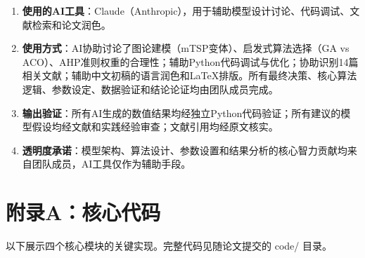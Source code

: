 \documentclass[12pt,a4paper]{ctexart}
\begin{document}
\begin{enumerate}[leftmargin=*, nosep]
    \item \textbf{使用的AI工具}：Claude（Anthropic），用于辅助模型设计讨论、代码调试、文献检索和论文润色。
    \item \textbf{使用方式}：AI协助讨论了图论建模（mTSP变体）、启发式算法选择（GA vs ACO）、AHP准则权重的合理性；辅助Python代码调试与优化；协助识别14篇相关文献；辅助中文初稿的语言润色和LaTeX排版。所有最终决策、核心算法逻辑、参数设定、数据验证和结论论证均由团队成员完成。
    \item \textbf{输出验证}：所有AI生成的数值结果均经独立Python代码验证；所有建议的模型假设均经文献和实践经验审查；文献引用均经原文核实。
    \item \textbf{透明度承诺}：模型架构、算法设计、参数设置和结果分析的核心智力贡献均来自团队成员，AI工具仅作为辅助手段。
\end{enumerate}

\newpage



\newpage
\section*{附录A：核心代码}

以下展示四个核心模块的关键实现。完整代码见随论文提交的 code/ 目录。
\end{document}
